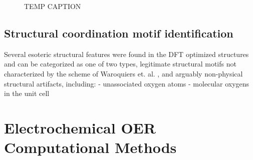 \begin{figure}[!htb]
\centering
{}
\caption{\label{fig:disc_rate}
TEMP CAPTION
}
\end{figure}


\subsection{Structural coordination motif identification} %
%
Several esoteric structural features were found in the DFT optimized structures and can be categorized as one of two types,
legitimate structural motifs not characterized by the scheme of Waroquiers et. al. \cite{Waroquiers2017}, and arguably non-physical structural artifacts, including:
- unassociated oxygen atoms
- molecular oxygens in the unit cell



\section{Electrochemical OER Computational Methods}  %
%


